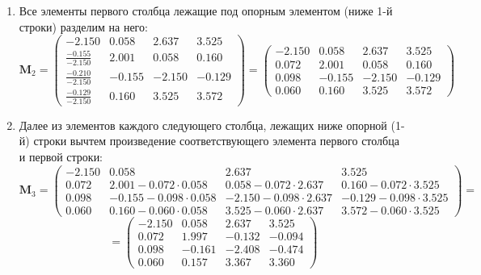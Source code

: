 \begin{enumerate}
    \item Все элементы первого столбца лежащие под опорным элементом (ниже 1-й строки) разделим на него:
    \[\mathbf{M}_2 =
    \begin{pmatrix}
        \mathbf{-2.150}& 0.058& 2.637& 3.525\\
        \frac{-0.155}{-2.150}& 2.001& 0.058& 0.160\\
        \frac{-0.210}{-2.150}&-0.155&-2.150&-0.129\\
        \frac{-0.129}{-2.150}& 0.160& 3.525& 3.572
    \end{pmatrix} =
    \begin{pmatrix}
        \mathbf{-2.150}& 0.058& 2.637& 3.525\\
        \mathit{0.072}& 2.001& 0.058& 0.160\\
        \mathit{0.098}&-0.155&-2.150&-0.129\\
        \mathit{0.060}& 0.160& 3.525& 3.572
    \end{pmatrix}\]

    \item Далее из элементов каждого следующего столбца, лежащих ниже опорной (1-й) строки вычтем произведение соответствующего элемента первого столбца и первой строки:
    \[\mathbf{M}_3 = \begin{pmatrix}
                -2.150& \mathbf{0.058}& \mathbf{2.637}& \mathbf{3.525}\\
        \mathit{0.072}& 2.001-0.072\cdot0.058& 0.058-0.072\cdot2.637& 0.160-0.072\cdot3.525\\
        \mathit{0.098}&-0.155-0.098\cdot0.058&-2.150-0.098\cdot2.637&-0.129-0.098\cdot3.525\\
        \mathit{0.060}& 0.160-0.060\cdot0.058& 3.525-0.060\cdot2.637& 3.572-0.060\cdot3.525
    \end{pmatrix}=\]
    \[=\begin{pmatrix}
       -2.150&  0.058&  2.637&  3.525\\
        0.072&  1.997& -0.132& -0.094\\
        0.098& -0.161& -2.408& -0.474\\
        0.060&  0.157&  3.367&  3.360
    \end{pmatrix}\]


\end{enumerate}
